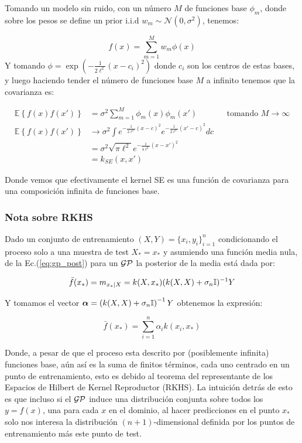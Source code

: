 Tomando un modelo sin ruido, con un número $M$ de funciones base $\phi_m$, donde sobre los pesos se define un prior i.i.d $w_m \sim \mathcal{N}(0, \sigma^2)$, tenemos:

\begin{equation}
	f(x) =  \sum_{m=1}^{M} w_m \phi(x)
\end{equation}
Y tomando $\phi=\exp(-\frac{1}{2\ell^2}(x- c_i)^2)$ donde $c_i$ son los centros de estas bases, y luego haciendo tender el número de funciones base $M$ a infinito tenemos que la covarianza es:

\begin{align}
	\mathbb{E}\left\{f(x) f(x')\right\} & = \sigma^2\sum_{m=1}^{M}  \phi_m(x)\phi_m(x') && \text{tomando } M\rightarrow \infty\\
	\mathbb{E}\left\{f(x) f(x')\right\} & \rightarrow \sigma^2 \int e^{-\frac{1}{2\ell^2}(x- c)^2} e^{-\frac{1}{2\ell^2}(x'- c)^2} dc \\
	& = \sigma^2 \sqrt{\pi\ell^2} e^{-\frac{1}{4\ell^2}(x- x')^2}\\
	& = k_{SE}(x, x')
\end{align}

Donde vemos que efectivamente el kernel SE es una función de covarianza para una composición infinita de funciones base.

\subsubsection{Nota sobre RKHS}
Dado un conjunto de entrenamiento $(X, Y) = \{x_i, y_i \}_{i=1}^{n}$ condicionando el proceso solo a una muestra de test $X_*=x_*$ y asumiendo una función media nula, de la Ec.(\ref{eq:gp_post}) para un $\mathcal{GP}$ la posterior de la media está dada por:

\begin{equation}
	\bar{f}(x_*) = m_{x_*|X} = k(X, x_*) (k(X, X) + \sigma_n {\mathbb I})^{-1} Y
\end{equation}

Y tomamos el vector $\bm{\alpha} = \left(k(X, X) + \sigma_n {\mathbb I} \right)^{-1} Y$ obtenemos la expresión:

\begin{equation}
	\bar{f}(x_*) = \sum_{i=1}^{n} \alpha_i k(x_i, x_*)
\end{equation}

Donde, a pesar de que el proceso esta descrito por (posiblemente infinita) funciones base, aún así es la suma de finitos términos, cada uno centrado en un punto de entrenamiento, esto es debido al teorema del representante de los Espacios de Hilbert de Kernel Reproductor (RKHS). La intuición detrás de esto es que incluso si el $\mathcal{GP}$ induce una distribución conjunta sobre todos los $y = f(x)$, una para cada $x$ en el dominio, al hacer predicciones en el punto $x_*$ solo nos interesa la distribución $(n+1)$-dimensional definida por los puntos de entrenamiento más este punto de test.
